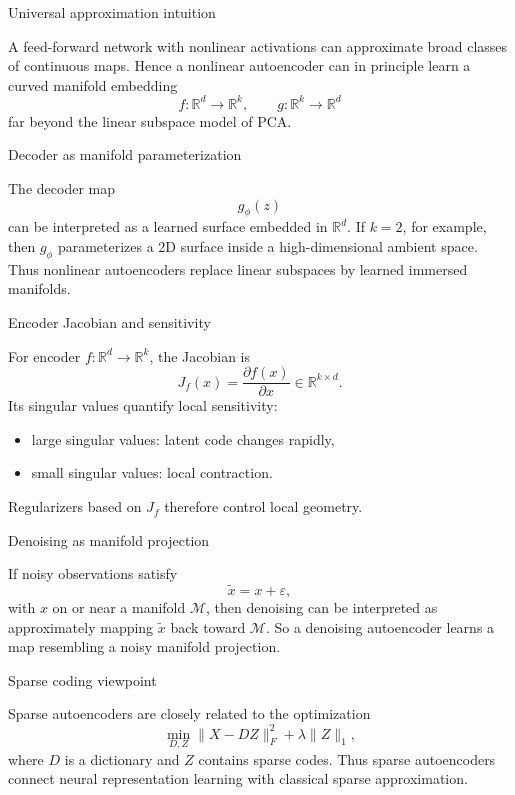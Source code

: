 \documentclass[aspectratio=169]{beamer}
\begin{document}
\begin{frame}{Universal approximation intuition}

A feed-forward network with nonlinear activations can approximate broad classes of continuous maps.
Hence a nonlinear autoencoder can in principle learn a curved manifold embedding
\[
f:\mathbb{R}^d \to \mathbb{R}^k,\qquad g:\mathbb{R}^k\to \mathbb{R}^d
\]
far beyond the linear subspace model of PCA.

\end{frame}

\begin{frame}{Decoder as manifold parameterization}

The decoder map
\[
g_\phi(z)
\]
can be interpreted as a learned surface embedded in \(\mathbb{R}^d\).
If \(k=2\), for example, then \(g_\phi\) parameterizes a 2D surface inside a high-dimensional ambient space.
Thus nonlinear autoencoders replace linear subspaces by learned immersed manifolds.

\end{frame}

\begin{frame}{Encoder Jacobian and sensitivity}

For encoder \(f:\mathbb{R}^d\to\mathbb{R}^k\), the Jacobian is
\[
J_f(x) = \frac{\partial f(x)}{\partial x}\in \mathbb{R}^{k\times d}.
\]
Its singular values quantify local sensitivity:
\begin{itemize}
\item large singular values: latent code changes rapidly,
\item small singular values: local contraction.
\end{itemize}
Regularizers based on \(J_f\) therefore control local geometry.

\end{frame}

\begin{frame}{Denoising as manifold projection}

If noisy observations satisfy
\[
\tilde x = x + \varepsilon,
\]
with \(x\) on or near a manifold \(\mathcal{M}\), then denoising can be interpreted as approximately mapping \(\tilde x\) back toward \(\mathcal{M}\).
So a denoising autoencoder learns a map resembling a noisy manifold projection.

\end{frame}

\begin{frame}{Sparse coding viewpoint}

Sparse autoencoders are closely related to the optimization
\[
\min_{D,Z} \|X-DZ\|_F^2 + \lambda \|Z\|_1,
\]
where \(D\) is a dictionary and \(Z\) contains sparse codes.
Thus sparse autoencoders connect neural representation learning with classical sparse approximation.

\end{frame}
\end{document}
